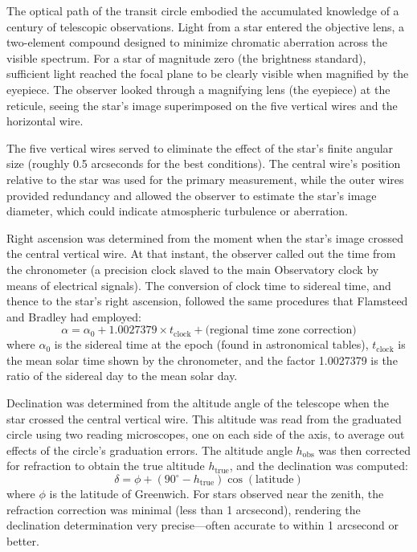 The optical path of the transit circle embodied the accumulated knowledge of a century of telescopic observations. Light from a star entered the objective lens, a two-element compound designed to minimize chromatic aberration across the visible spectrum. For a star of magnitude zero (the brightness standard), sufficient light reached the focal plane to be clearly visible when magnified by the eyepiece. The observer looked through a magnifying lens (the eyepiece) at the reticule, seeing the star's image superimposed on the five vertical wires and the horizontal wire.

The five vertical wires served to eliminate the effect of the star's finite angular size (roughly 0.5 arcseconds for the best conditions). The central wire's position relative to the star was used for the primary measurement, while the outer wires provided redundancy and allowed the observer to estimate the star's image diameter, which could indicate atmospheric turbulence or aberration.

Right ascension was determined from the moment when the star's image crossed the central vertical wire. At that instant, the observer called out the time from the chronometer (a precision clock slaved to the main Observatory clock by means of electrical signals). The conversion of clock time to sidereal time, and thence to the star's right ascension, followed the same procedures that Flamsteed and Bradley had employed:
\[
  \alpha = \alpha_0 + 1.0027379 \times t_{\text{clock}} + \text{(regional time zone correction)}
\]
where $\alpha_0$ is the sidereal time at the epoch (found in astronomical tables), $t_{\text{clock}}$ is the mean solar time shown by the chronometer, and the factor 1.0027379 is the ratio of the sidereal day to the mean solar day.

Declination was determined from the altitude angle of the telescope when the star crossed the central vertical wire. This altitude was read from the graduated circle using two reading microscopes, one on each side of the axis, to average out effects of the circle's graduation errors. The altitude angle $h_{\text{obs}}$ was then corrected for refraction to obtain the true altitude $h_{\text{true}}$, and the declination was computed:
\[
  \delta = \phi + (90^{\circ} - h_{\text{true}}) \cos(\text{latitude})
\]
where $\phi$ is the latitude of Greenwich. For stars observed near the zenith, the refraction correction was minimal (less than 1 arcsecond), rendering the declination determination very precise—often accurate to within 1 arcsecond or better.

